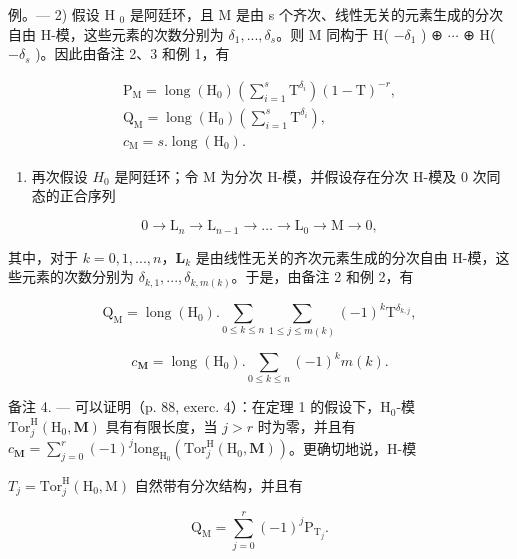 例。--- 2) 假设 H \(_{0}\) 是阿廷环，且 M 是由 s 个齐次、线性无关的元素生成的分次自由 H-模，这些元素的次数分别为 \(\delta_{1}, ..., \delta_{s}\)。则 M 同构于 H( \(-\delta_{1}\) ) ⊕ \(\cdots\) ⊕ H( \(-\delta_{s}\) )。因此由备注 2、3 和例 1，有

\[
\begin{array}{l} \mathrm {P_ {M}} = \operatorname{long} (\mathrm {H_ {0}}) \left(\sum_ {i = 1} ^ {s} \mathrm{T} ^ {\delta_ {i}}\right) (1 - \mathrm{T}) ^ {- r}, \\ \mathrm {Q_ {M}} = \operatorname{long} (\mathrm {H_ {0}}) \left(\sum_ {i = 1} ^ {s} \mathrm{T} ^ {\delta_ {i}}\right), \\ c _ {\mathrm{M}} = s. \operatorname{long} (\mathrm {H_ {0}}). \end{array}
\]

\begin{enumerate}
\def\labelenumi{\arabic{enumi})}
\setcounter{enumi}{2}
\tightlist
\item
  再次假设 \(H_{0}\) 是阿廷环；令 M 为分次 H-模，并假设存在分次 H-模及 0 次同态的正合序列
\end{enumerate}

\[
0 \to \mathrm{L} _ {n} \to \mathrm{L} _ {n - 1} \to \dots \to \mathrm{L} _ {0} \to \mathrm{M} \to 0,
\]

其中，对于 \(k=0,1,...,n\)，\(\mathbf{L}_{k}\) 是由线性无关的齐次元素生成的分次自由 H-模，这些元素的次数分别为 \(\delta_{k,1},..., \delta_{k,m(k)}\)。于是，由备注 2 和例 2，有

\[
\mathrm{Q} _ {\mathrm{M}} = \operatorname{long} (\mathrm{H} _ {0}). \sum_ {0 \leqslant k \leqslant n} \sum_ {1 \leqslant j \leqslant m (k)} (- 1) ^ {k} \mathrm{T} ^ {\delta_ {k, j}},
\]

\[
c _ {\mathbf {M}} = \operatorname{long} (\mathrm{H} _ {0}). \sum_ {0 \leqslant k \leqslant n} (- 1) ^ {k} m (k).
\]

备注 4. --- 可以证明（p. 88, exerc. 4）：在定理 1 的假设下，\(\mathrm{H}_{0}\)-模 \(\mathrm{Tor}_{j}^{\mathrm{H}}(\mathrm{H}_{0},\mathbf{M})\) 具有有限长度，当 \(j > r\) 时为零，并且有 \(c_{\mathbf{M}} = \sum_{j=0}^{r} (-1)^{j} \mathrm{long}_{\mathrm{H}_{0}}(\mathrm{Tor}_{j}^{\mathrm{H}}(\mathrm{H}_{0},\mathbf{M}))\)。更确切地说，H-模

\(T_{j} = \text{Tor}_{j}^{\text{H}}(\text{H}_{0}, \text{M})\) 自然带有分次结构，并且有

\[
\mathrm{Q} _ {\mathrm{M}} = \sum_ {j = 0} ^ {r} (- 1) ^ {j} \mathrm{P} _ {\mathrm{T} _ {j}}.
\]

